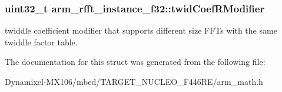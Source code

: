 \subsubsection[{\texorpdfstring{twid\+Coef\+R\+Modifier}{twidCoefRModifier}}]{\setlength{\rightskip}{0pt plus 5cm}uint32\+\_\+t arm\+\_\+rfft\+\_\+instance\+\_\+f32\+::twid\+Coef\+R\+Modifier}\hypertarget{structarm__rfft__instance__f32_aede85350fb5ae6baa1b3e8bfa15b18d6}{}\label{structarm__rfft__instance__f32_aede85350fb5ae6baa1b3e8bfa15b18d6}
twiddle coefficient modifier that supports different size F\+F\+Ts with the same twiddle factor table. 

The documentation for this struct was generated from the following file\+:\begin{DoxyCompactItemize}
\item 
Dynamixel-\/\+M\+X106/mbed/\+T\+A\+R\+G\+E\+T\+\_\+\+N\+U\+C\+L\+E\+O\+\_\+\+F446\+R\+E/arm\+\_\+math.\+h\end{DoxyCompactItemize}
